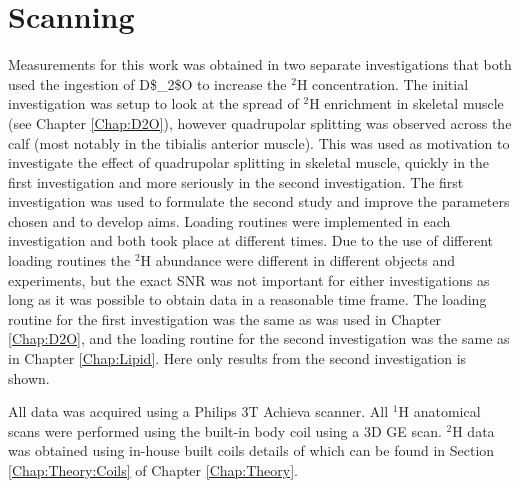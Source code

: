 \section{Scanning}

Measurements for this work was obtained in two separate investigations that both used the ingestion of \ac{D$_2$O} to increase the $^2$H concentration. The initial investigation was setup to look at the spread of $^2$H enrichment in skeletal muscle (see Chapter \ref{Chap:D2O}), however quadrupolar splitting was observed across the calf (most notably in the tibialis anterior muscle). This was used as motivation to investigate the effect of quadrupolar splitting in skeletal muscle, quickly in the first investigation and more seriously in the second investigation. The first investigation was used to formulate the second study and improve the parameters chosen and to develop aims. Loading routines were implemented in each investigation and both took place at different times. Due to the use of different loading routines the $^2$H abundance were different in different objects and experiments, but the exact \ac{SNR} was not important for either investigations as long as it was possible to obtain data in a reasonable time frame. The loading routine for the first investigation was the same as was used in Chapter \ref{Chap:D2O}, and the loading routine for the second investigation was the same as in Chapter \ref{Chap:Lipid}. Here only results from the second investigation is shown.

All data was acquired using a Philips 3T Achieva scanner. All $^1$H anatomical scans were performed using the built-in body coil using a 3D \ac{GE} scan. $^2$H data was obtained using in-house built coils details of which can be found in Section \ref{Chap:Theory:Coils} of Chapter \ref{Chap:Theory}. 


